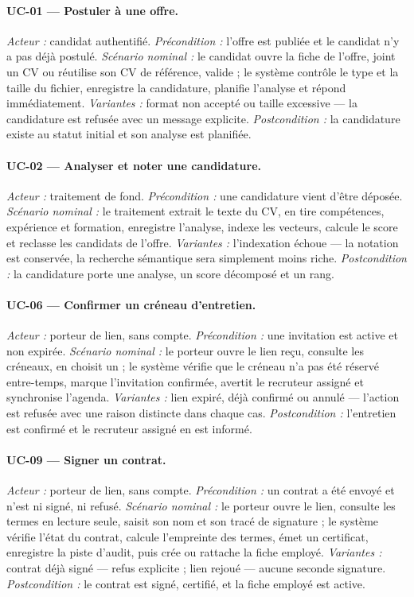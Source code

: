 \paragraph{UC-01 — Postuler à une offre.}
\emph{Acteur :} candidat authentifié. \emph{Précondition :} l'offre est
publiée et le candidat n'y a pas déjà postulé. \emph{Scénario nominal :} le
candidat ouvre la fiche de l'offre, joint un CV ou réutilise son CV de
référence, valide ; le système contrôle le type et la taille du fichier,
enregistre la candidature, planifie l'analyse et répond immédiatement.
\emph{Variantes :} format non accepté ou taille excessive — la candidature est
refusée avec un message explicite. \emph{Postcondition :} la candidature existe
au statut initial et son analyse est planifiée.

\paragraph{UC-02 — Analyser et noter une candidature.}
\emph{Acteur :} traitement de fond. \emph{Précondition :} une candidature vient
d'être déposée. \emph{Scénario nominal :} le traitement extrait le texte du CV,
en tire compétences, expérience et formation, enregistre l'analyse, indexe les
vecteurs, calcule le score et reclasse les candidats de l'offre.
\emph{Variantes :} l'indexation échoue — la notation est conservée, la
recherche sémantique sera simplement moins riche. \emph{Postcondition :} la
candidature porte une analyse, un score décomposé et un rang.

\paragraph{UC-06 — Confirmer un créneau d'entretien.}
\emph{Acteur :} porteur de lien, sans compte. \emph{Précondition :} une
invitation est active et non expirée. \emph{Scénario nominal :} le porteur
ouvre le lien reçu, consulte les créneaux, en choisit un ; le système vérifie
que le créneau n'a pas été réservé entre-temps, marque l'invitation confirmée,
avertit le recruteur assigné et synchronise l'agenda.
\emph{Variantes :} lien expiré, déjà confirmé ou annulé — l'action est refusée
avec une raison distincte dans chaque cas. \emph{Postcondition :} l'entretien
est confirmé et le recruteur assigné en est informé.

\paragraph{UC-09 — Signer un contrat.}
\emph{Acteur :} porteur de lien, sans compte. \emph{Précondition :} un contrat
a été envoyé et n'est ni signé, ni refusé. \emph{Scénario nominal :} le porteur
ouvre le lien, consulte les termes en lecture seule, saisit son nom et son
tracé de signature ; le système vérifie l'état du contrat, calcule l'empreinte
des termes, émet un certificat, enregistre la piste d'audit, puis crée ou
rattache la fiche employé. \emph{Variantes :} contrat déjà signé — refus
explicite ; lien rejoué — aucune seconde signature. \emph{Postcondition :} le
contrat est signé, certifié, et la fiche employé est active.

